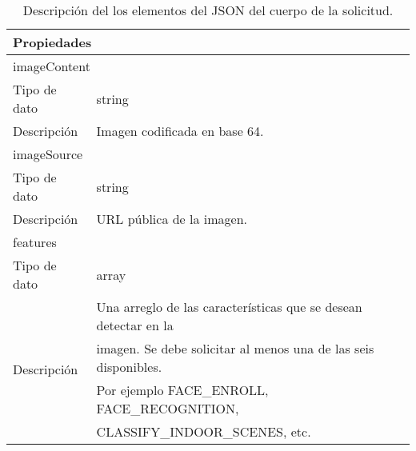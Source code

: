 \begin{table}[h!]
\caption{Descripción del los elementos del JSON del cuerpo de la solicitud.\label{tab:body_json_schema_request}}
\begin{tabular}{|l|l}
\hline
\multicolumn{2}{|l|}{\textbf{Propiedades}}                                                                                                                                                                                                      \\ \hline
\multicolumn{2}{|l|}{imageContent}                                                                                                                                                                                                              \\ \hline
Tipo de dato & \multicolumn{1}{l|}{string}                                                                                                                                                                                                      \\ \hline
Descripción  & \multicolumn{1}{l|}{Imagen codificada en base 64.}                                                                                                                                                                               \\ \hline
\multicolumn{2}{|l|}{imageSource}                                                                                                                                                                                                               \\ \hline
Tipo de dato & \multicolumn{1}{l|}{string}                                                                                                                                                                                                      \\ \hline
Descripción  & \multicolumn{1}{l|}{URL pública de la imagen.}                                                                                                                                                                                   \\ \hline
\multicolumn{2}{|l|}{features}                                                                                                                                                                                                                  \\ \hline
Tipo de dato & \multicolumn{1}{l|}{array}                                                                                                                                                                                                       \\ \hline
\multirow{4}{*}{Descripción}  & 
\multicolumn{1}{l|}{
Una arreglo de las características que se desean detectar
en la} \\
&
\multicolumn{1}{l|}{imagen. Se debe solicitar al menos una de las seis disponibles.} \\&
\multicolumn{1}{l|}{Por ejemplo FACE\_ENROLL, FACE\_RECOGNITION,} \\& 
\multicolumn{1}{l|}{CLASSIFY\_INDOOR\_SCENES, etc.}



\end{tabular}
\end{table}
